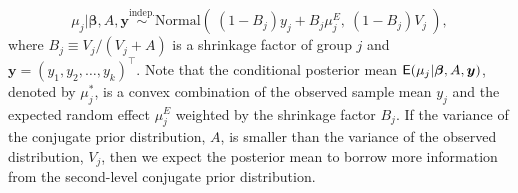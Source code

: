 \documentclass[article]{jss}
\begin{document}
\begin{equation} \label{normalpost}
\mu_{j}\vert  \boldsymbol{\beta}, A, \boldsymbol{y} \stackrel{\textrm{indep.}}{\sim}\textrm{Normal}(~(1-B_{j})y_{j} + B_{j}\mu^E_{j},~(1-B_{j})V_{j}~),
\end{equation}
where $B_{j}\equiv V_{j}/(V_{j} + A)$ is a shrinkage factor of group $j$ and $\boldsymbol{y}=(y_1, y_2, \ldots, y_k)^\top$. Note that the conditional posterior mean $\mathsf{E}(\mu_{j}\vert \boldsymbol{\beta}, A, \boldsymbol{y} )$, denoted by $\mu^\ast_j$,  is a convex combination of the observed sample mean $y_j$ and the expected random effect $\mu^E_j$ weighted by the shrinkage factor $B_j$. If the variance of the conjugate prior distribution, $A$, is smaller than the variance of the observed distribution, $V_j$, then we expect the posterior mean to borrow more information from the second-level conjugate prior distribution.

\end{document}
